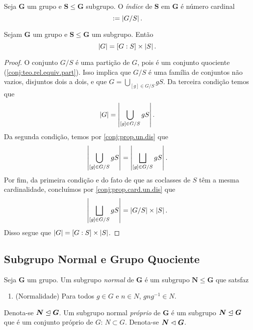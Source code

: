 \begin{defi}
Seja $\bm G$ um grupo e $\bm S \leq \bm G$ subgrupo. O \emph{índice} de $\bm S$ em $\bm G$ é número cardinal
	\begin{equation*}
	[G : S] := \card{G/S}.
	\end{equation*}
\end{defi}

\begin{prop}
Sejam $\bm G$ um grupo e $\bm S \leq \bm G$ um subgrupo. Então
	\begin{equation*}
	\left\vert{G}\right\vert=[G:S] \times \left\vert{S}\right\vert.
	\end{equation*}
\end{prop}
\begin{proof}
O conjunto $G/S$ é uma partição de $G$, pois é um conjunto quociente (\ref{conj:teo.rel.equiv.part}). Isso implica que $G/S$ é uma família de conjuntos não vazios, disjuntos dois a dois, e que $G = \bigcup_{[g] \in G/S} gS$. Da terceira condição temos que
	\begin{equation*}
	\left\vert{G}\right\vert = \left\vert{\bigcup_{[g] \in G/S} gS}\right\vert.
	\end{equation*}
Da segunda condição, temos por \ref{conj:prop.un.dis} que
	\begin{equation*}
	\left\vert{\bigcup_{[g] \in G/S} gS}\right\vert = \left\vert{\bigsqcup_{[g] \in G/S} gS}\right\vert.
	\end{equation*}
Por fim, da primeira condição e do fato de que as coclasses de $S$ têm a mesma cardinalidade, concluímos por \ref{conj:prop.card.un.dis} que
	\begin{equation*}
	\left\vert{\bigsqcup_{[g] \in G/S} gS}\right\vert = \left\vert{G/S}\right\vert \times \left\vert{S}\right\vert.
	\end{equation*}
Disso segue que $\left\vert{G}\right\vert=[G:S] \times \left\vert{S}\right\vert$.
\end{proof}

\subsection{Subgrupo Normal e Grupo Quociente}

\begin{defi}
Seja $\bm G$ um grupo. Um subgrupo \emph{normal} de $\bm G$ é um subgrupo $\bm N \leq \bm G$ que satsfaz
	\begin{enumerate}[label={SGN\arabic*.}]
	\item \label{SGN} (Normalidade) Para todos $g \in G$ e $n \in N$, $gng^{-1} \in N$.
	\end{enumerate}
\noindent
Denota-se $\bm N \mathrel{\unlhd} \bm G$. Um subgrupo normal \emph{próprio} de $\bm G$ é um subgrupo $\bm N \mathrel{\unlhd} \bm G$ que é um conjunto próprio de $G$: $N \subset G$. Denota-se $\bm N \mathrel{\lhd} \bm G$.
\end{defi}

